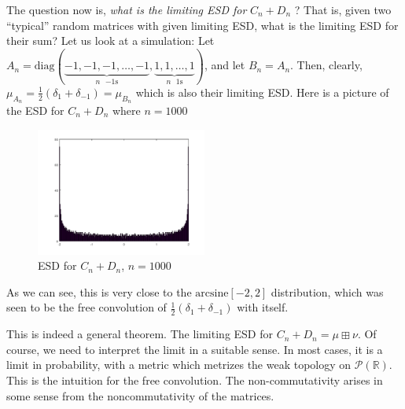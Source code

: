 \documentclass[aspectratio=169]{beamer}
\newcommand{\R}{\mathbb{R}}
\begin{document}
\begin{frame}
    The question now is, \emph{what is the limiting ESD for} $C_n + D_n$ ? That is, given two ``typical'' random matrices with given limiting ESD, what is the limiting ESD for their sum? \pause Let us look at a simulation: Let $A_n = \text{diag}(\underbrace{-1, -1, -1, \ldots, -1}_{\text{$n$ $-1$s}}, \underbrace{1, 1, \ldots, 1}_{\text{$n$ $1$s}})$, and let $B_n = A_n$. \pause Then, clearly, $\mu_{A_n} = \frac{1}{2}(\delta_1 + \delta_{-1}) = \mu_{B_n}$ which is also their limiting ESD. \pause Here is a picture of the ESD for $C_n + D_n$ where $n = 1000$
\end{frame}


\begin{frame}
\begin{figure}
    \centering
    \centering
    \includegraphics[width = 0.5\textwidth]{freeconv}
    \caption{ESD for $C_n + D_n$, $n = 1000$}
\end{figure}

As we can see, this is very close to the $\text{arcsine}[-2, 2]$ distribution, which was seen to be the free convolution of $\frac{1}{2}(\delta_{1} + \delta_{-1})$ with itself. 
\end{frame}

\begin{frame}
    This is indeed a general theorem. The limiting ESD for $C_n + D_n = \mu \boxplus \nu$. \pause Of course, we need to interpret the limit in a suitable sense. In most cases, it is a limit in probability, with a metric which metrizes the weak topology on $\mathcal{P}(\R)$. \vskip 10pt \noindent
    This is the intuition for the free convolution. The non-commutativity arises in some sense from the noncommutativity of the matrices.
\end{frame}
\end{document}
